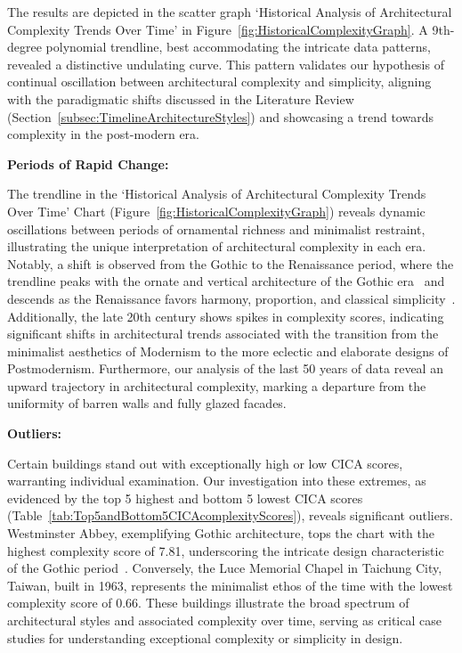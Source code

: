 The results are depicted in the scatter graph `Historical Analysis of Architectural Complexity Trends Over Time' in Figure~\ref{fig:HistoricalComplexityGraph}.
A 9th-degree polynomial trendline, best accommodating the intricate data patterns, revealed a distinctive undulating curve.
This pattern validates our hypothesis of continual oscillation between architectural complexity and simplicity, aligning with the paradigmatic shifts discussed in the Literature Review (Section~\ref{subsec:TimelineArchitectureStyles}) and showcasing a trend towards complexity in the post-modern era.

\textbf{Periods of Rapid Change:}

The trendline in the `Historical Analysis of Architectural Complexity Trends Over Time' Chart (Figure~\ref{fig:HistoricalComplexityGraph}) reveals dynamic oscillations between periods of ornamental richness and minimalist restraint, illustrating the unique interpretation of architectural complexity in each era.
Notably, a shift is observed from the Gothic to the Renaissance period, where the trendline peaks with the ornate and vertical architecture of the Gothic era~\cite{Kennedy2013} and descends as the Renaissance favors harmony, proportion, and classical simplicity~\cite{Marder1990}.
Additionally, the late 20th century shows spikes in complexity scores, indicating significant shifts in architectural trends associated with the transition from the minimalist aesthetics of Modernism to the more eclectic and elaborate designs of Postmodernism.
Furthermore, our analysis of the last 50 years of data reveal an upward trajectory in architectural complexity, marking a departure from the uniformity of barren walls and fully glazed facades.

\textbf{Outliers:}

Certain buildings stand out with exceptionally high or low CICA scores, warranting individual examination.
Our investigation into these extremes, as evidenced by the top 5 highest and bottom 5 lowest CICA scores (Table~\ref{tab:Top5andBottom5CICAcomplexityScores}), reveals significant outliers.
Westminster Abbey, exemplifying Gothic architecture, tops the chart with the highest complexity score of 7.81, underscoring the intricate design characteristic of the Gothic period~\cite{Kennedy2013}.
Conversely, the Luce Memorial Chapel in Taichung City, Taiwan, built in 1963, represents the minimalist ethos of the time with the lowest complexity score of 0.66.
These buildings illustrate the broad spectrum of architectural styles and associated complexity over time, serving as critical case studies for understanding exceptional complexity or simplicity in design.



